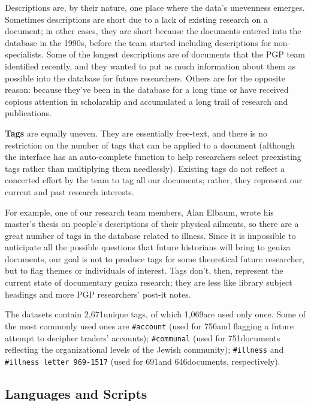 \documentclass{article}
\def\uniqueTags{2,671}
\def\taggedAccount{756}
\def\taggedCommunal{751}
\def\taggedIllness{691}
\def\taggedIllnessLetter{646}
\def\singletonTags{1,069}
\begin{document}
Descriptions are, by their nature, one place where the data’s unevenness emerges. Sometimes descriptions are short due to a lack of existing research on a document; in other cases, they are short because the documents entered into the database in the 1990s, before the team started including descriptions for non-specialists. Some of the longest descriptions are of documents that the PGP team identified recently, and they wanted to put as much information about them as possible into the database for future researchers. Others are for the opposite reason: because they’ve been in the database for a long time or have received copious attention in scholarship and accumulated a long trail of research and publications. 

\textbf{Tags} are equally uneven. They are essentially free-text, and there is no restriction on the number of tags that can be applied to a document (although the interface has an auto-complete function to help researchers select preexisting tags rather than multiplying them needlessly). Existing tags do not reflect a concerted effort by the team to tag all our documents; rather, they represent our current and past research interests. 

For example, one of our research team members, Alan Elbaum, wrote his master’s thesis on people’s descriptions of their physical ailments, so there are a great number of tags in the database related to illness. Since it is impossible to anticipate all the possible questions that future historians will bring to geniza documents, our goal is not to produce tags for some theoretical future researcher, but to flag themes or individuals of interest. Tags don’t, then, represent the current state of documentary geniza research; they are less like library subject headings and more PGP researchers’ post-it notes.

The datasets contain \uniqueTags unique tags, of which \singletonTags are used only once. Some of the most commonly used ones are \texttt{\#account} (used for \taggedAccount and flagging a future attempt to decipher traders’ accounts); \texttt{\#communal} (used for \taggedCommunal documents reflecting the organizational levels of the Jewish community); \texttt{\#illness} and \texttt{\#illness letter 969-1517}  (used for \taggedIllness and \taggedIllnessLetter documents, respectively). 

\subsection{Languages and Scripts}
\end{document}
